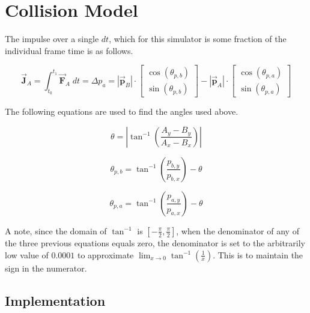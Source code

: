 \documentclass[12pt]{article}
\begin{document}
\section{Collision Model}
    \begin{flushleft}
        The impulse over a single $dt$, which for this simulator is some fraction of the individual frame time is as follows. 
    \end{flushleft}
    \[ 
        \vec{\mathbf{J}}_A=
        \int_{t_{0}}^{t_{1}} \vec{\mathbf{F}}_{A}\;dt=
        \Delta p_{a}=\left| \vec{\mathbf{p}}_{B} \right|\cdot 
        \begin{bmatrix} 
            \cos\left( \theta_{p,b} \right) \\ 
            \sin\left( \theta_{p,b} \right) 
        \end{bmatrix} 
        - \left| \vec{\mathbf{p}}_{A} \right|\cdot 
        \begin{bmatrix} 
            \cos\left( \theta_{p,a} \right) \\ 
            \sin\left( \theta_{p,a} \right) 
        \end{bmatrix} 
    \]
    \begin{flushleft}
        The following equations are used to find the angles used above.
    \end{flushleft}
    \[ 
        \theta=\left| \tan^{-1}\left( \frac{A_{y}-B_{y}}{A_{x}-B_{x}} \right) \right|
    \]

    \[
        \theta_{p,b}=\tan^{-1}\left( \frac{p_{b,y}}{p_{b,x}} \right) - \theta
    \]

    \[
        \theta_{p,a}=\tan^{-1}\left( \frac{p_{a,y}}{p_{a,x}} \right) - \theta  
    \]

    \begin{flushleft}
        A note, since the domain of $\tan^{-1}$ is $\left[ -\frac{\pi}{2}, \frac{\pi}{2} \right]$, when the denominator of any of the three previous equations equals zero, the denominator is set to the arbitrarily low value of $0.0001$ to approximate $\lim_{x\to 0}\tan^{-1}\left(\frac{1}{x}\right)$. This is to maintain the sign in the numerator.
    \end{flushleft}

\subsection{Implementation} 

\end{document}
